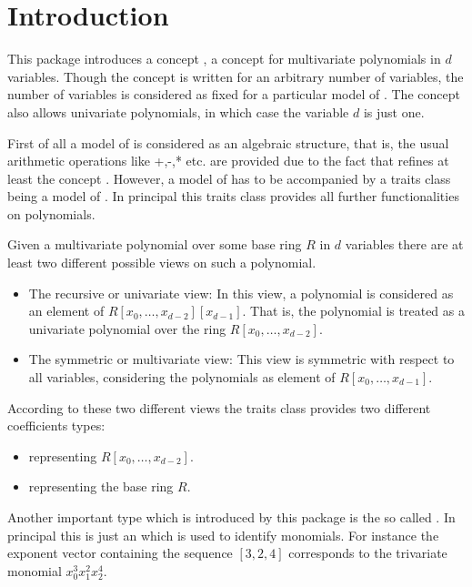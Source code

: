 

\section{Introduction}

This package introduces a concept , a concept for multivariate 
polynomials in $d$ variables. Though the concept is written for an arbitrary 
number of variables, the number of variables is considered as fixed for a particular
model of . The concept also allows univariate polynomials, in which case 
the variable $d$ is just one. 

First of all a model of  is considered as an algebraic structure, that 
is, the usual arithmetic operations like +,-,* etc. are provided due to the fact that 
 refines at least the concept . 
However, a model of  has to be accompanied by a traits class 
 being a model of . 
In principal this traits class provides all further functionalities on polynomials.

Given a multivariate polynomial over some base ring $R$ in $d$ variables there are at least 
two different possible views on such a polynomial.
\begin{itemize}
\item The recursive or univariate view:  In this view, a polynomial is considered as 
an element of $R[x_0,\dots,x_{d-2}][x_{d-1}]$. That is, the polynomial 
is treated as a univariate polynomial over the ring $R[x_0,\dots,x_{d-2}]$. 
\item The symmetric or multivariate view: This view is symmetric 
with respect to all variables, considering the polynomials as element of $R [x_0,\dots,x_{d-1}]$.
\end{itemize}

According to these two different views the traits class provides two different coefficients types:
\begin{itemize}
\item {} representing $R[x_0,\dots,x_{d-2}]$.
\item {} representing the base ring $R$.
\end{itemize}

Another important type which is introduced by this package is the so called . 
In principal this is just an  which is used to identify monomials. 
For instance the exponent vector containing the sequence $[3,2,4]$ corresponds to the 
trivariate monomial $x_0^3x_1^2x_2^4$. 


